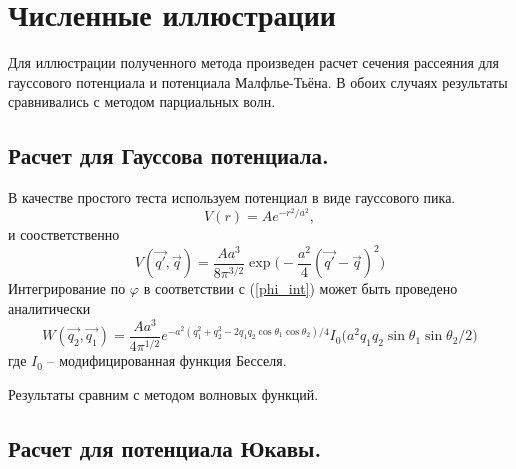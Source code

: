 \documentclass[a4paper,12pt]{article}
\begin{document}
\section{Численные иллюстрации}
Для иллюстрации полученного метода произведен расчет сечения рассеяния для гауссового потенциала и потенциала Малфлье-Тьёна. В обоих случаях результаты сравнивались с методом парциальных волн. 


	\subsection{Расчет для Гауссова потенциала.}
	В качестве простого теста используем потенциал в виде гауссового пика.
	\begin{equation}
	   V(r) = A e^{-r^2/a^2},
	\end{equation}
	и соостветственно
	\begin{equation}
	   V(\vec{q'},\vec{q}) = \frac{Aa^3}{8\pi^{3/2}}\exp\big( - \frac{a^2}{4}(\vec{q'}-\vec{q})^2 \big)
	\end{equation}
	Интегрирование по $\varphi$ в соответствии с (\ref{phi_int}) может быть проведено аналитически
	\begin{equation}
	   W(\vec{q_2},\vec{q_1}) = \frac{Aa^3}{4\pi^{1/2}} e^{ - a^2( q_1^2 + q_2^2 - 2q_1q_2\cos\theta_1\cos\theta_2)/4 }
	    I_0 \big( a^2q_1q_2\sin\theta_1\sin\theta_2/2 \big)
	\end{equation}
	где $I_0$ -- модифицированная функция Бесселя.
	
	Результаты сравним с методом волновых функций.
	
	
	
	\subsection{Расчет для потенциала Юкавы.}
\end{document}
